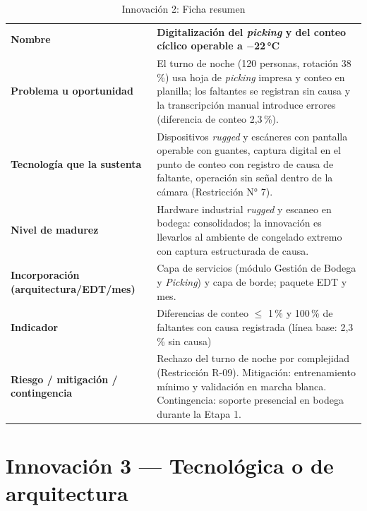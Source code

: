 \begin{table}[htbp]
\centering
\small
\caption{Innovación 2: Ficha resumen}
\label{tab:inn2}
\begin{tabularx}{\textwidth}{@{}L{5.2cm}X@{}}
\toprule
\textbf{Nombre} &
\textbf{Digitalización del \emph{picking} y del conteo cíclico operable a $-$22\,°C} \\
\addlinespace
\textbf{Problema u oportunidad} &
El turno de noche (120 personas, rotación 38\,\%) usa hoja de \emph{picking} impresa y
conteo en planilla; los faltantes se registran sin causa y la transcripción manual
introduce errores (diferencia de conteo 2,3\,\%). \\
\addlinespace
\textbf{Tecnología que la sustenta} &
Dispositivos \emph{rugged} y escáneres con pantalla operable con guantes, captura digital
en el punto de conteo con registro de causa de faltante, operación sin señal dentro de la
cámara (Restricción N° 7). \\
\addlinespace
\textbf{Nivel de madurez} &
Hardware industrial \emph{rugged} y escaneo en bodega: consolidados; la innovación es
llevarlos al ambiente de congelado extremo con captura estructurada de causa. \\
\addlinespace
\textbf{Incorporación (arquitectura/EDT/mes)} &
Capa de servicios (módulo Gestión de Bodega y \emph{Picking}) y capa de borde; \pendiente{}
paquete EDT y mes. \\
\addlinespace
\textbf{Indicador} &
Diferencias de conteo $\leq$ 1\,\% y 100\,\% de faltantes con causa registrada
(línea base: 2,3\,\% sin causa) \\
\addlinespace
\textbf{Riesgo / mitigación / contingencia} &
Rechazo del turno de noche por complejidad (Restricción R-09). Mitigación: entrenamiento
mínimo y validación en marcha blanca. Contingencia: soporte presencial en bodega durante
la Etapa 1. \\
\bottomrule
\end{tabularx}
\end{table}

\section{Innovación 3 — Tecnológica o de arquitectura}

